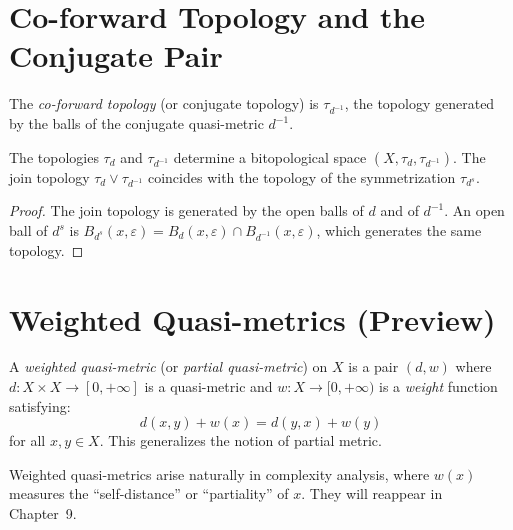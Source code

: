 \section{Co-forward Topology and the Conjugate Pair}

\begin{definition}
The \emph{co-forward topology} (or conjugate topology) is $\tau_{d^{-1}}$, the topology
generated by the balls of the conjugate quasi-metric $d^{-1}$.
\end{definition}

\begin{proposition}
The topologies $\tau_d$ and $\tau_{d^{-1}}$ determine a bitopological space
$(X, \tau_d, \tau_{d^{-1}})$. The join topology $\tau_d \vee \tau_{d^{-1}}$ coincides
with the topology of the symmetrization $\tau_{d^s}$.
\end{proposition}

\begin{proof}
The join topology is generated by the open balls of $d$ and of $d^{-1}$. An open ball of
$d^s$ is $B_{d^s}(x,\varepsilon) = B_d(x,\varepsilon) \cap B_{d^{-1}}(x,\varepsilon)$,
which generates the same topology.
\end{proof}

\section{Weighted Quasi-metrics (Preview)}

\begin{definition}
A \emph{weighted quasi-metric} (or \emph{partial quasi-metric}) on $X$ is a pair
$(d, w)$ where $d\colon X \times X \to [0,+\infty]$ is a quasi-metric and
$w\colon X \to [0,+\infty)$ is a \emph{weight} function satisfying:
\[
  d(x,y) + w(x) = d(y,x) + w(y)
\]
for all $x,y \in X$. This generalizes the notion of partial metric.
\end{definition}

\begin{remark}
Weighted quasi-metrics arise naturally in complexity analysis, where $w(x)$ measures the
``self-distance'' or ``partiality'' of $x$. They will reappear in Chapter~9.
\end{remark}

